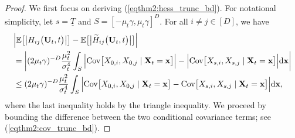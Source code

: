 \documentclass[11pt,a4paper,final]{article}
\numberwithin{equation}{section}
\theoremstyle{remark}
\newcommand{\bU}{{\bf U}}
\newcommand{\bx}{{\bf x}}
\newcommand{\bX}{{\bf X}}
\newcommand{\bbE}{{\mathbb E}}
\newcommand{\be}{\begin{equation}}
\newcommand{\ee}{\end{equation}}
\def\d{{\rm d}}
\begin{document}
\begin{proof}
We first focus on deriving (\ref{eqthm2:hess_trunc_bd}).
For notational simplicity, let $s = \underline{T}$ and $S = [-\mu_{t}\gamma, \mu_{t}\gamma]^{D}$.
For all $i \neq j \in [D]$, we have
\be
\begin{split}
 & \Big\vert  \bbE \big[  \big\vert H_{ij} \big( \bU_{t}, t \big)  \big\vert  \big] -  \bbE \big[   \big\vert \widetilde H_{ij} \big( \bU_{t}, t \big)  \big\vert \big]  \Big\vert 
 \\
& =  \left\vert ( 2\mu_{t} \gamma)^{-D}  \frac{\mu_{t}^2}{\sigma_{t}^{4}} 
 \int_{S}   \Big\vert \text{Cov} \big[ X_{0,i}, X_{0,j} \mid \bX_{t} = \bx \big] \Big\vert  -
\Big\vert \text{Cov} \big[ X_{s,i}, X_{s,j} \mid \bX_{t} = \bx \big] \Big\vert  \d \bx \right\vert
 \\
 & \leq ( 2\mu_{t} \gamma)^{-D}  \frac{\mu_{t}^2}{\sigma_{t}^{4}} 
\int_{S}   \Big\vert \text{Cov} \big[ X_{0,i}, X_{0,j} \mid \bX_{t} = \bx \big] -
\text{Cov} \big[ X_{s,i}, X_{s,j} \mid \bX_{t} = \bx \big] \Big\vert
 \d \bx,
 \label{eqthm2:0_s_diff}
 \end{split}
\ee
where the last inequality holds by the triangle inequality.
We proceed by bounding the difference between the two conditional covariance terms; see (\ref{eqthm2:cov_trunc_bd}).


\end{proof}
\end{document}
